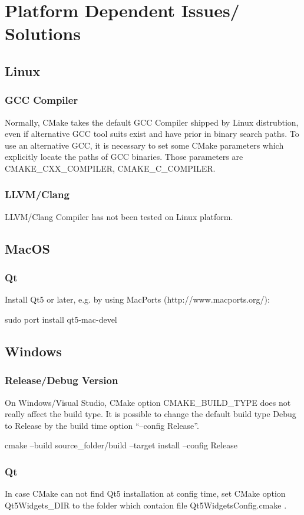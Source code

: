 \section{Platform Dependent Issues/ Solutions}
\label{app:platform}
\subsection{Linux}
\subsubsection{GCC Compiler}
Normally, CMake takes the default GCC Compiler shipped by Linux distrubtion, even if alternative GCC tool suits exist and have prior in binary search paths.
To use an alternative GCC, it is necessary to set some CMake parameters which explicitly locate the paths of GCC binaries. Those parameters are CMAKE\_CXX\_COMPILER, CMAKE\_C\_COMPILER.
\subsubsection{LLVM/Clang}
LLVM/Clang Compiler has not been tested on Linux platform. 

\subsection{MacOS}
\subsubsection{Qt}
Install Qt5 or later, e.g. by using MacPorts (http://www.macports.org/):
\begin{listing}[mybash]
sudo port install qt5-mac-devel
\end{listing}


\subsection{Windows}
\subsubsection{Release/Debug Version}
On Windows/Visual Studio, CMake option CMAKE\_BUILD\_TYPE does not really affect the build type. It is possible to change the default build type Debug to Release by the build time option ``--config Release''.
\begin{listing}[mybash]
cmake --build {source_folder}/build --target install --config Release
\end{listing}

\subsubsection{Qt}
In case CMake can not find Qt5 installation at config time, set CMake option Qt5Widgets\_DIR to the folder which contaion file Qt5WidgetsConfig.cmake .

